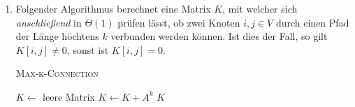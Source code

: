 \documentclass[a4paper]{scrartcl}
\begin{document}
\begin{enumerate}
    \item
        Folgender Algorithmus berechnet eine Matrix $K$, mit welcher sich
        \emph{anschließend} in $\Theta(1)$ prüfen lässt, ob zwei Knoten
        $i,j \in V$ durch einen Pfad der Länge höchtens $k$ verbunden werden
        können.
        Ist dies der Fall, so gilt $K[i,j] \neq 0$, sonst ist $K[i,j] = 0$.
        \begin{algorithm}
            \caption{\textsc{Max-k-Connection}}
            \begin{algorithmic}[1]
                    \State $K \gets$ leere Matrix
                        \State $K \gets K + A^k$
                    \EndFor
                    \State \Return $K$
                \EndProcedure
            \end{algorithmic}
        \end{algorithm}

\end{enumerate}
\end{document}

